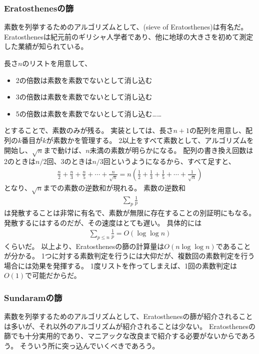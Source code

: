 \subsubsection{Eratosthenesの篩}
素数を列挙するためのアルゴリズムとして、(sieve of Eratosthenes)は有名だ。
Eratosthenesは紀元前のギリシャ人学者であり、他に地球の大きさを初めて測定した業績が知られている。

長さ$n$のリストを用意して、
\begin{itemize}
 \item 2の倍数は素数を素数でないとして消し込む
 \item 3の倍数は素数を素数でないとして消し込む
 \item 5の倍数は素数を素数でないとして消し込む……
\end{itemize}
とすることで、素数のみが残る。
実装としては、長さ$n+1$の配列を用意し、配列の$k$番目が$k$が素数かを管理する。
2以上をすべて素数として、アルゴリズムを開始し、$\sqrt{n}$まで動けば、$n$未満の素数が明らかになる。
配列の書き換え回数は2のときは$n/2$回、3のときは$n/3$回というようになるから、すべて足すと、
\begin{align*}
\frac{n}{2} + \frac{n}{3} + \frac{n}{5} + \cdots + \frac{n}{\sqrt{n}} = n\left(\frac{1}{2}+\frac{1}{3}+\frac{1}{5}+\cdots+\frac{1}{\sqrt{n}}\right)
\end{align*}
となり、$\sqrt{n}$までの素数の逆数和が現れる。
素数の逆数和
\begin{align*}
\sum_p \frac{1}{p}
\end{align*}
は発散することは非常に有名で、素数が無限に存在することの別証明にもなる。
発散するにはするのだが、その速度はとても遅い。
具体的には
\begin{align*}
\sum_{p\le n}\frac{1}{p} = O(\log{\log{n}})
\end{align*}
くらいだ。
以上より、Eratosthenesの篩の計算量は$O(n\log{\log{n}})$であることが分かる。
1つに対する素数判定を行うには大仰だが、複数回の素数判定を行う場合には効果を発揮する。
1度リストを作ってしまえば、1回の素数判定は$O(1)$で可能だからだ。


\subsubsection{Sundaramの篩}
素数を列挙するためのアルゴリズムとして、Eratosthenesの篩が紹介されることは多いが、それ以外のアルゴリズムが紹介されることは少ない。
Eratosthenesの篩でも十分実用的であり、マニアックな改良まで紹介する必要がないからであろう。
そういう所に突っ込んでいくべきであろう。

